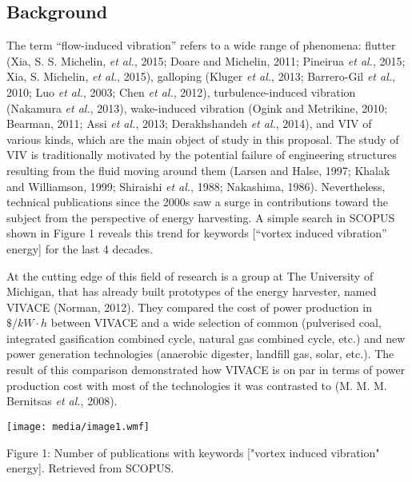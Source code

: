 \documentclass[]{article}
\begin{document}
\hypertarget{background}{\subsection{Background}\label{background}}

The term ``flow-induced vibration'' refers to a wide range of phenomena:
flutter (Xia, S. S. Michelin, \emph{et al.}, 2015; Doare and Michelin,
2011; Pineirua \emph{et al.}, 2015; Xia, S. Michelin, \emph{et al.},
2015), galloping (Kluger \emph{et al.}, 2013; Barrero-Gil \emph{et al.},
2010; Luo \emph{et al.}, 2003; Chen \emph{et al.}, 2012),
turbulence-induced vibration (Nakamura \emph{et al.}, 2013),
wake-induced vibration (Ogink and Metrikine, 2010; Bearman, 2011; Assi
\emph{et al.}, 2013; Derakhshandeh \emph{et al.}, 2014), and VIV of
various kinds, which are the main object of study in this proposal. The
study of VIV is traditionally motivated by the potential failure of
engineering structures resulting from the fluid moving around them
(Larsen and Halse, 1997; Khalak and Williamson, 1999; Shiraishi \emph{et
al.}, 1988; Nakashima, 1986). Nevertheless, technical publications since
the 2000s saw a surge in contributions toward the subject from the
perspective of energy harvesting. A simple search in SCOPUS shown in
Figure 1 reveals this trend for keywords {[}``vortex induced vibration''
energy{]} for the last 4 decades.

At the cutting edge of this field of research is a group at The
University of Michigan, that has already built prototypes of the energy
harvester, named VIVACE (Norman, 2012). They compared the cost of power
production in \(\$/kW \cdot h\) between VIVACE and a wide selection of
common (pulverised coal, integrated gasification combined cycle, natural
gas combined cycle, etc.) and new power generation technologies
(anaerobic digester, landfill gas, solar, etc.). The result of this
comparison demonstrated how VIVACE is on par in terms of power
production cost with most of the technologies it was contrasted to (M.
M. M. Bernitsas \emph{et al.}, 2008).

\protect\hypertarget{_Toc520544808}{}{}\texttt{[image: media/image1.wmf]}

\protect\hypertarget{_Ref520282982}{}{\protect\hypertarget{_Toc520544685}{}{\protect\hypertarget{_Toc41048824}{}{}}}Figure
1: Number of publications with keywords {[}"vortex induced vibration"
energy{]}. Retrieved from SCOPUS.
\end{document}

